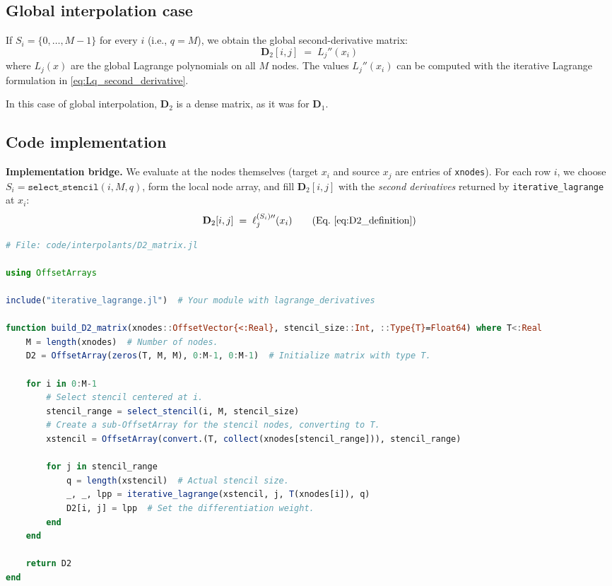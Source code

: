 \subsection*{Global interpolation case}

If \(S_i=\{0,\dots,M-1\}\) for every \(i\) (i.e., \(q=M\)), we obtain the global
second-derivative matrix:
\begin{equation}
\boxed{\;
\mathbf{D}_2[i,j] \;=\; L_j''(x_i)
\;}
\label{eq:D2_global_def}
\end{equation}
where \(L_j(x)\) are the global Lagrange polynomials on all \(M\) nodes. The values
\(L_j''(x_i)\) can be computed with the iterative Lagrange formulation in
\eqref{eq:Lq_second_derivative}.

In this case of global interpolation, \(\mathbf{D}_2\) is a dense matrix, as it was for \(\mathbf{D}_1\).

\clearpage

\subsection*{Code implementation}
\noindent\textbf{Implementation bridge.}
We evaluate at the nodes themselves (target \(x_i\) and source \(x_j\) are entries of
\texttt{xnodes}). For each row \(i\), we choose \(S_i=\texttt{select\_stencil}(i,M,q)\),
form the local node array, and fill \(\mathbf{D}_2[i,j]\) with the \emph{second derivatives}
returned by \texttt{iterative\_lagrange} at \(x_i\):
\[
\mathbf{D}_2[i,j] \;=\; \ell^{(S_i)\prime\prime}_j(x_i)\qquad\text{(Eq.~\eqref{eq:D2_definition})}
\]

\begin{lstlisting}[language=Julia]
# File: code/interpolants/D2_matrix.jl

using OffsetArrays

include("iterative_lagrange.jl")  # Your module with lagrange_derivatives

function build_D2_matrix(xnodes::OffsetVector{<:Real}, stencil_size::Int, ::Type{T}=Float64) where T<:Real
    M = length(xnodes)  # Number of nodes.
    D2 = OffsetArray(zeros(T, M, M), 0:M-1, 0:M-1)  # Initialize matrix with type T.

    for i in 0:M-1
        # Select stencil centered at i.
        stencil_range = select_stencil(i, M, stencil_size)
        # Create a sub-OffsetArray for the stencil nodes, converting to T.
        xstencil = OffsetArray(convert.(T, collect(xnodes[stencil_range])), stencil_range)

        for j in stencil_range
            q = length(xstencil)  # Actual stencil size.
            _, _, lpp = iterative_lagrange(xstencil, j, T(xnodes[i]), q)
            D2[i, j] = lpp  # Set the differentiation weight.
        end
    end

    return D2
end
\end{lstlisting}

